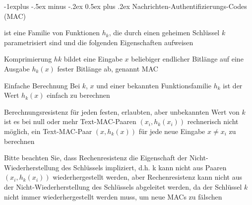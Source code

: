 \documentclass[a4paper]{article}
\makeatletter
\renewcommand{\subsection}{\@startsection{subsection}{2}{0mm}%
 {-1explus -.5ex minus -.2ex}%
 {0.5ex plus .2ex}%
 {\normalfont\normalsize\bfseries}}
\makeatother
\begin{document}
\begin{multicols}{3}
      \subsection{Nachrichten-Authentifizierungs-Codes (MAC)}
      \begin{itemize*}
            \item ist eine Familie von Funktionen $h_k$, die durch einen geheimen Schlüssel $k$ parametrisiert sind und die folgenden Eigenschaften aufweisen
            \begin{description*}
                  \item[Komprimierung] $hk$ bildet eine Eingabe $x$ beliebiger endlicher Bitlänge auf eine Ausgabe $h_k(x)$ fester Bitlänge ab, genannt MAC
                  \item[Einfache Berechnung] Bei $k$, $x$ und einer bekannten Funktionsfamilie $h_k$ ist der Wert $h_k(x)$ einfach zu berechnen
                  \item[Berechnungsresistenz] für jeden festen, erlaubten, aber unbekannten Wert von $k$ ist es bei null oder mehr Text-MAC-Paaren $(x_i, h_k(x_i))$ rechnerisch nicht möglich, ein Text-MAC-Paar $(x, h_k(x))$ für jede neue Eingabe $x\not= x_i$ zu berechnen
            \end{description*}
            \item Bitte beachten Sie, dass Rechenresistenz die Eigenschaft der Nicht-Wiederherstellung des Schlüssels impliziert, d.h. k kann nicht aus Paaren $(x_i,h_k(x_i))$ wiederhergestellt werden, aber Rechenresistenz kann nicht aus der Nicht-Wiederherstellung des Schlüssels abgeleitet werden, da der Schlüssel $k$ nicht immer wiederhergestellt werden muss, um neue MACs zu fälschen
      \end{itemize*}


\end{multicols}
\end{document}
